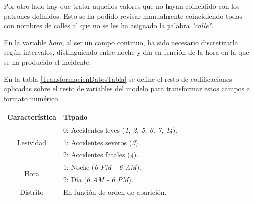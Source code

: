 \begin{enumerate}
                    Por otro lado hay que tratar aquellos valores que no hayan coincidido con los patrones definidos. Esto se ha podido revisar manualmente coincidiendo todas con nombres de calles al que no se les ha asignado la palabra \textit{"calle"}.

                    En la variable \textit{hora}, al ser un campo continuo, ha sido necesario discretizarla según intervalos, distinguiendo entre noche y día en función de la hora en la que se ha producido el incidente.


                    En la tabla \eqref{TransformacionDatosTabla} se define el resto de codificaciones aplicadas sobre el resto de variables del modelo para transformar estos campos a formato numérico.

                    \begin{table}[H]
                        \renewcommand{\arraystretch}{1.4}
                        \scriptsize

                        \begin{minipage}{0.4\textwidth}
                            \begin{tabular}{|c|l|}
                                \hline
                                \textbf{Característica} & \textbf{Tipado}\\

                                \hline
                                \multirow{3}{*}{Lesividad}              & 0: Accidentes leves (\textit{1, 2, 5, 6, 7, 14}).\\
                                                                        & 1: Accidentes severos (\textit{3}).\\
                                                                        & 2: Accidentes fatales (\textit{4}).\\

                                \hline
                                \multirow{2}{*}{Hora}                   & 1: Noche (\textit{6 PM - 6 AM}).\\
                                                                        & 2: Día (\textit{6 AM - 6 PM}).\\
                                \hline
                                \multirow{1}{*}{Distrito}               & En función de orden de aparición.\\


\end{tabular}
\end{minipage}
\end{table}
\end{enumerate}
